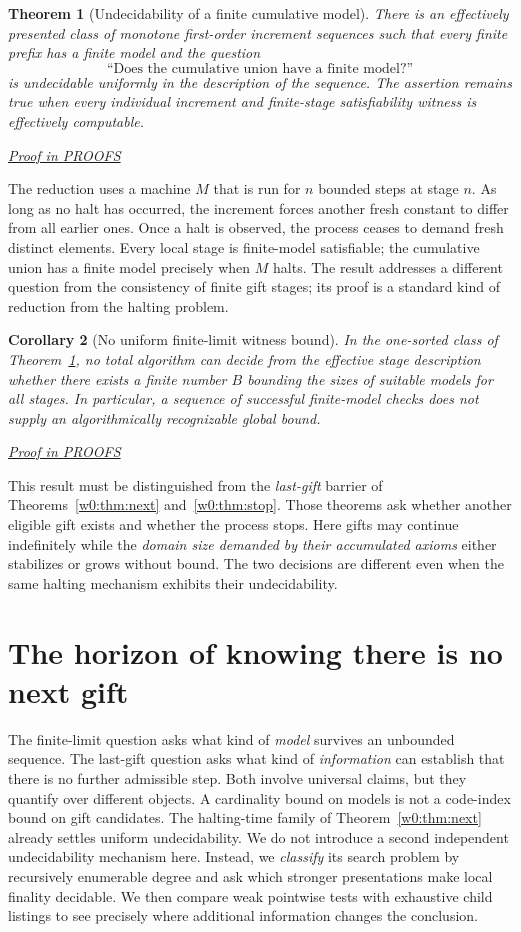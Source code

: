 \documentclass[11pt,letterpaper]{article}
\newtheorem{theorem}{Theorem}[section]
\newtheorem{corollary}[theorem]{Corollary}
\theoremstyle{definition}\newtheorem{definition}[theorem]{Definition}\newtheorem{example}[theorem]{Example}
\theoremstyle{remark}\newtheorem{remark}[theorem]{Remark}
\newcommand{\prooflink}[1]{\par\noindent\hfill\small\hyperref[#1]{\textit{Proof in PROOFS}}\normalsize}
\begin{document}
\begin{theorem}[Undecidability of a finite cumulative model]\label{w2:th:finundec}
There is an effectively presented class of monotone first-order increment sequences such that every finite prefix has a finite model and the question
\[
 \text{``Does the cumulative union have a finite model?''}
\]
is undecidable uniformly in the description of the sequence. The assertion remains true when every individual increment and finite-stage satisfiability witness is effectively computable.
\prooflink{w2:pr:finundec}
\end{theorem}

The reduction uses a machine $M$ that is run for $n$ bounded steps at stage $n$. As long as no halt has occurred, the increment forces another fresh constant to differ from all earlier ones. Once a halt is observed, the process ceases to demand fresh distinct elements. Every local stage is finite-model satisfiable; the cumulative union has a finite model precisely when $M$ halts. The result addresses a different question from the consistency of finite
gift stages; its proof is a standard kind of reduction from the halting
problem.

\begin{corollary}[No uniform finite-limit witness bound]\label{w2:co:bound}
In the one-sorted class of Theorem~\ref{w2:th:finundec}, no total algorithm can decide from the effective stage description whether there exists a finite number $B$ bounding the sizes of suitable models for all stages. In particular, a sequence of successful finite-model checks does not supply an algorithmically recognizable global bound.
\prooflink{w2:pr:bound}
\end{corollary}

This result must be distinguished from the \emph{last-gift} barrier of
Theorems~\ref{w0:thm:next} and~\ref{w0:thm:stop}. Those theorems ask whether another eligible gift exists and whether the process stops. Here gifts may continue indefinitely while the \emph{domain size demanded by their accumulated axioms} either stabilizes or grows without bound. The two decisions are different even when the same halting mechanism exhibits their undecidability.


\section{The horizon of knowing there is no next gift}\label{sec:horizon-braid}
The finite-limit question asks what kind of \emph{model} survives an
unbounded sequence. The last-gift question asks what kind of \emph{information}
can establish that there is no further admissible step. Both involve
universal claims, but they quantify over different objects. A cardinality
bound on models is not a code-index bound on gift candidates. The halting-time family of Theorem~\ref{w0:thm:next} already settles
uniform undecidability. We do not introduce a second independent
undecidability mechanism here. Instead, we \emph{classify} its search
problem by recursively enumerable degree and ask which stronger
presentations make local finality decidable. We then compare weak
pointwise tests with exhaustive child listings to see precisely where
additional information changes the conclusion.
\end{document}
